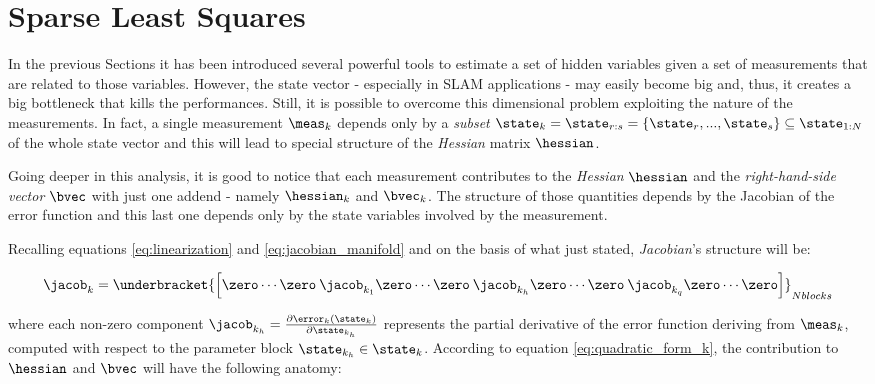 \section{Sparse Least Squares}\label{sec:sparse_ls}
In the previous Sections it has been introduced several powerful tools to estimate a set of hidden variables given a set of measurements that are related to those variables. However, the state vector - especially in SLAM applications - may easily become big and, thus, it creates a big bottleneck that kills the performances. Still, it is possible to overcome this dimensional problem exploiting the nature of the measurements. In fact, a single measurement $\meas_k$ depends only by a \textit{subset} $\state_k = \state_{r:s} = \{\state_r, ..., \state_s\} \subseteq \state_{1:N} $ of the whole state vector and this will lead to special structure of the \textit{Hessian} matrix $\hessian$.

Going deeper in this analysis, it is good to notice that each measurement contributes to the \textit{Hessian} $\hessian$ and the \textit{right-hand-side vector} $\bvec$ with just one addend - namely $\hessian_k$ and $\bvec_k$. The structure of those quantities depends by the Jacobian of the error function and this last one depends only by the state variables involved by the measurement. 

Recalling equations \ref{eq:linearization} and \ref{eq:jacobian_manifold} and on the basis of what just stated, \textit{Jacobian}'s structure will be:

\begin{equation}
    \jacob_k = \underbracket{\left[\zero \cdots \zero \: \jacob_{k_1} \zero \cdots \zero \: \jacob_{k_h} \zero \cdots \zero \: \jacob_{k_q} \zero \cdots \zero\right]}_{N blocks}
    \label{eq:sparse_jacobian}
\end{equation}

\noindent where each non-zero component $\jacob_{k_h} = \frac{\partial \error_k(\state_k)}{\partial \state_{k_h}}$ represents the partial derivative of the error function deriving from $\meas_k$, computed with respect to the parameter block $\state_{k_h} \in \state_k$. According to equation \ref{eq:quadratic_form_k}, the contribution to $\hessian$ and $\bvec$ will have the following anatomy:

